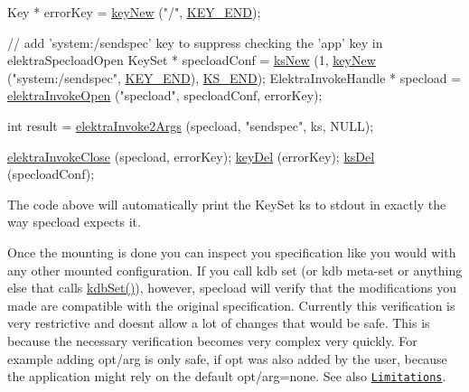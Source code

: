 \begin{DoxyCode}
Key * errorKey = \hyperlink{group__key_gad23c65b44bf48d773759e1f9a4d43b89}{keyNew} (\textcolor{stringliteral}{"/"}, \hyperlink{group__key_gga9b703ca49f48b482def322b77d3e6bc8aa8adb6fcb92dec58fb19410eacfdd403}{KEY\_END});

\textcolor{comment}{// add 'system:/sendspec' key to suppress checking the 'app' key in elektraSpecloadOpen}
KeySet * specloadConf = \hyperlink{group__keyset_ga671e1aaee3ae9dc13b4834a4ddbd2c3c}{ksNew} (1, \hyperlink{group__key_gad23c65b44bf48d773759e1f9a4d43b89}{keyNew} (\textcolor{stringliteral}{"system:/sendspec"}, \hyperlink{group__key_gga9b703ca49f48b482def322b77d3e6bc8aa8adb6fcb92dec58fb19410eacfdd403}{KEY\_END}), 
      \hyperlink{group__keyset_ga7a28fce3773b2c873c94ac80b8b4cd54}{KS\_END});
ElektraInvokeHandle * specload = \hyperlink{group__invoke_ga3eb20131e9a8fc9a6cebf126927c09bc}{elektraInvokeOpen} (\textcolor{stringliteral}{"specload"}, specloadConf, errorKey);

\textcolor{keywordtype}{int} result = \hyperlink{group__invoke_gaa257d93399c60f73c611205bbfa7c9a0}{elektraInvoke2Args} (specload, \textcolor{stringliteral}{"sendspec"}, ks, NULL);

\hyperlink{group__invoke_ga684a21daa0b3c20783c55184a9157b3b}{elektraInvokeClose} (specload, errorKey);
\hyperlink{group__key_ga3df95bbc2494e3e6703ece5639be5bb1}{keyDel} (errorKey);
\hyperlink{group__keyset_ga27e5c16473b02a422238c8d970db7ac8}{ksDel} (specloadConf);
\end{DoxyCode}


The code above will automatically print the Key\+Set {\ttfamily ks} to stdout in exactly the way {\ttfamily specload} expects it.

Once the mounting is done you can inspect you specification like you would with any other mounted configuration. If you call {\ttfamily kdb set} (or {\ttfamily kdb meta-\/set} or anything else that calls {\ttfamily \hyperlink{group__kdb_ga11436b058408f83d303ca5e996832bcf}{kdb\+Set()}}), however, {\ttfamily specload} will verify that the modifications you made are compatible with the original specification. Currently this verification is very restrictive and doesn\textquotesingle{}t allow a lot of changes that would be safe. This is because the necessary verification becomes very complex very quickly. For example adding {\ttfamily opt/arg} is only safe, if {\ttfamily opt} was also added by the user, because the application might rely on the default {\ttfamily opt/arg=none}. See also \href{#limitations}{\tt Limitations}.

